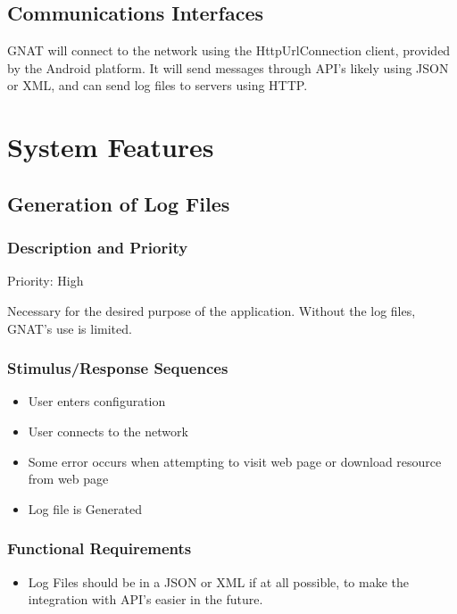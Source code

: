 \documentclass{scrreprt}
\begin{document}
\section{Communications Interfaces}

GNAT will connect to the network using the HttpUrlConnection client, provided by the Android platform. It will send messages through API's likely using JSON or XML, and can send log files to servers using HTTP.

\chapter{System Features}

\section{Generation of Log Files}

\subsection{Description and Priority}

Priority: High

Necessary for the desired purpose of the application.  Without the log files, GNAT's use is limited.

\subsection{Stimulus/Response Sequences}
\begin{itemize}
  \item User enters configuration
  \item User connects to the network
  \item Some error occurs when attempting to visit web page or download resource from web page
  \item Log file is Generated
\end{itemize}

\subsection{Functional Requirements}

\begin{itemize}
  \item Log Files should be in a JSON or XML if at all possible, to make the integration with API's easier in the future.
\end{itemize}
\end{document}
